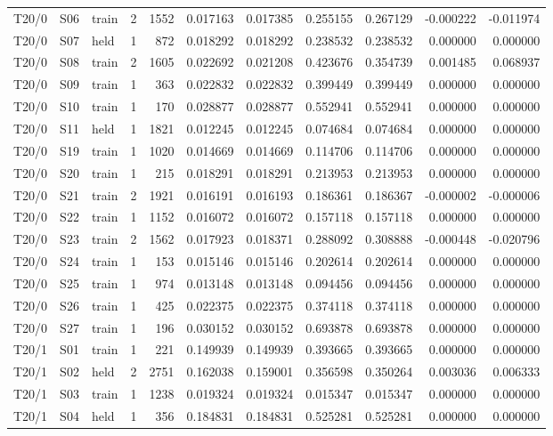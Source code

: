 \documentclass[10pt,a4paper]{article}
\begin{document}
{{\begin{longtable}{@{}lllrrrrrrrr@{}}
T20/0 & S06 & train & 2 & 1552 & 0.017163 & 0.017385 & 0.255155 & 0.267129 & -0.000222 & -0.011974 \\
T20/0 & S07 & held & 1 & 872 & 0.018292 & 0.018292 & 0.238532 & 0.238532 & 0.000000 & 0.000000 \\
T20/0 & S08 & train & 2 & 1605 & 0.022692 & 0.021208 & 0.423676 & 0.354739 & 0.001485 & 0.068937 \\
T20/0 & S09 & train & 1 & 363 & 0.022832 & 0.022832 & 0.399449 & 0.399449 & 0.000000 & 0.000000 \\
T20/0 & S10 & train & 1 & 170 & 0.028877 & 0.028877 & 0.552941 & 0.552941 & 0.000000 & 0.000000 \\
T20/0 & S11 & held & 1 & 1821 & 0.012245 & 0.012245 & 0.074684 & 0.074684 & 0.000000 & 0.000000 \\
T20/0 & S19 & train & 1 & 1020 & 0.014669 & 0.014669 & 0.114706 & 0.114706 & 0.000000 & 0.000000 \\
T20/0 & S20 & train & 1 & 215 & 0.018291 & 0.018291 & 0.213953 & 0.213953 & 0.000000 & 0.000000 \\
T20/0 & S21 & train & 2 & 1921 & 0.016191 & 0.016193 & 0.186361 & 0.186367 & -0.000002 & -0.000006 \\
T20/0 & S22 & train & 1 & 1152 & 0.016072 & 0.016072 & 0.157118 & 0.157118 & 0.000000 & 0.000000 \\
T20/0 & S23 & train & 2 & 1562 & 0.017923 & 0.018371 & 0.288092 & 0.308888 & -0.000448 & -0.020796 \\
T20/0 & S24 & train & 1 & 153 & 0.015146 & 0.015146 & 0.202614 & 0.202614 & 0.000000 & 0.000000 \\
T20/0 & S25 & train & 1 & 974 & 0.013148 & 0.013148 & 0.094456 & 0.094456 & 0.000000 & 0.000000 \\
T20/0 & S26 & train & 1 & 425 & 0.022375 & 0.022375 & 0.374118 & 0.374118 & 0.000000 & 0.000000 \\
T20/0 & S27 & train & 1 & 196 & 0.030152 & 0.030152 & 0.693878 & 0.693878 & 0.000000 & 0.000000 \\
T20/1 & S01 & train & 1 & 221 & 0.149939 & 0.149939 & 0.393665 & 0.393665 & 0.000000 & 0.000000 \\
T20/1 & S02 & held & 2 & 2751 & 0.162038 & 0.159001 & 0.356598 & 0.350264 & 0.003036 & 0.006333 \\
T20/1 & S03 & train & 1 & 1238 & 0.019324 & 0.019324 & 0.015347 & 0.015347 & 0.000000 & 0.000000 \\
T20/1 & S04 & held & 1 & 356 & 0.184831 & 0.184831 & 0.525281 & 0.525281 & 0.000000 & 0.000000 \\

\end{longtable}}}
\end{document}
